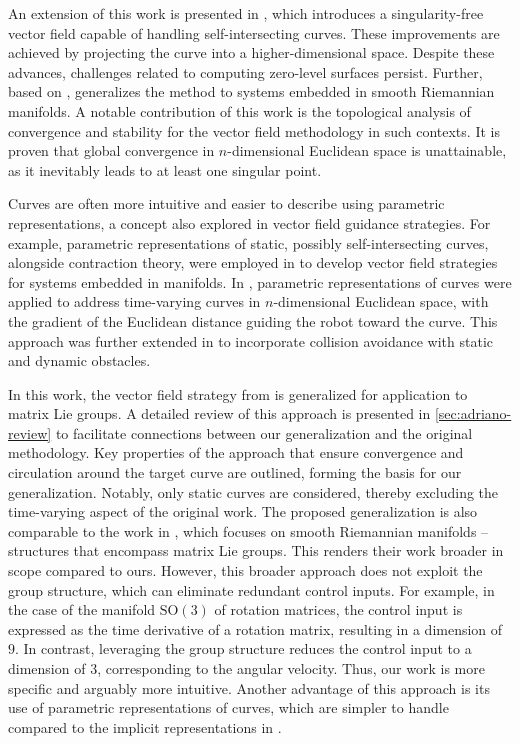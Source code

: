 An extension of this work is presented in \citet{yao2021singularity}, which introduces a singularity-free vector field capable of handling self-intersecting curves. These improvements are achieved by projecting the curve into a higher-dimensional space. Despite these advances, challenges related to computing zero-level surfaces persist. Further, based on \citet{goncalves2010vectorfield}, \citet{yao2022topological} generalizes the method to systems embedded in smooth Riemannian manifolds. A notable contribution of this work is the topological analysis of convergence and stability for the vector field methodology in such contexts. It is proven that global convergence in $n$-dimensional Euclidean space is unattainable, as it inevitably leads to at least one singular point.

Curves are often more intuitive and easier to describe using parametric representations, a concept also explored in vector field guidance strategies. For example, parametric representations of static, possibly self-intersecting curves, alongside contraction theory, were employed in \citet{Wu2018} to develop vector field strategies for systems embedded in manifolds. In \citet{Rezende2022}, parametric representations of curves were applied to address time-varying curves in $n$-dimensional Euclidean space, with the gradient of the Euclidean distance guiding the robot toward the curve. This approach was further extended in \citet{Nunes2022} to incorporate collision avoidance with static and dynamic obstacles.

In this work, the vector field strategy from \citet{Rezende2022} is generalized for application to matrix Lie groups. A detailed review of this approach is presented in \cref{sec:adriano-review} to facilitate connections between our generalization and the original methodology. Key properties of the approach that ensure convergence and circulation around the target curve are outlined, forming the basis for our generalization. Notably, only static curves are considered, thereby excluding the time-varying aspect of the original work. The proposed generalization is also comparable to the work in \citet{yao2022topological}, which focuses on smooth Riemannian manifolds -- structures that encompass matrix Lie groups. This renders their work broader in scope compared to ours. However, this broader approach does not exploit the group structure, which can eliminate redundant control inputs. For example, in the case of the manifold $\text{SO}(3)$ of rotation matrices, the control input is expressed as the time derivative of a rotation matrix, resulting in a dimension of $9$. In contrast, leveraging the group structure reduces the control input to a dimension of $3$, corresponding to the angular velocity. Thus, our work is more specific and arguably more intuitive. Another advantage of this approach is its use of parametric representations of curves, which are simpler to handle compared to the implicit representations in \citet{yao2022topological}.

